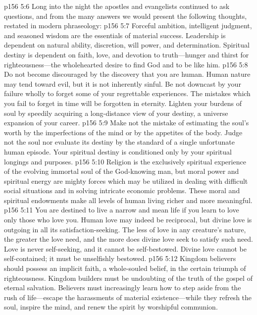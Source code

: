 \vs p156 5:6 Long into the night the apostles and evangelists continued to ask questions, and from the many answers we would present the following thoughts, restated in modern phraseology:
\vs p156 5:7 Forceful ambition, intelligent judgment, and seasoned wisdom are the essentials of material success. Leadership is dependent on natural ability, discretion, will power, and determination. Spiritual destiny is dependent on faith, love, and devotion to truth---hunger and thirst for righteousness---the wholehearted desire to find God and to be like him.
\vs p156 5:8 Do not become discouraged by the discovery that you are human. Human nature may tend toward evil, but it is not inherently sinful. Be not downcast by your failure wholly to forget some of your regrettable experiences. The mistakes which you fail to forget in time will be forgotten in eternity. Lighten your burdens of soul by speedily acquiring a long\hyp{}distance view of your destiny, a universe expansion of your career.
\vs p156 5:9 Make not the mistake of estimating the soul’s worth by the imperfections of the mind or by the appetites of the body. Judge not the soul nor evaluate its destiny by the standard of a single unfortunate human episode. Your spiritual destiny is conditioned only by your spiritual longings and purposes.
\vs p156 5:10 Religion is the exclusively spiritual experience of the evolving immortal soul of the God\hyp{}knowing man, but moral power and spiritual energy are mighty forces which may be utilized in dealing with difficult social situations and in solving intricate economic problems. These moral and spiritual endowments make all levels of human living richer and more meaningful.
\vs p156 5:11 You are destined to live a narrow and mean life if you learn to love only those who love you. Human love may indeed be reciprocal, but divine love is outgoing in all its satisfaction\hyp{}seeking. The less of love in any creature’s nature, the greater the love need, and the more does divine love seek to satisfy such need. Love is never self\hyp{}seeking, and it cannot be self\hyp{}bestowed. Divine love cannot be self\hyp{}contained; it must be unselfishly bestowed.
\vs p156 5:12 Kingdom believers should possess an implicit faith, a whole\hyp{}souled belief, in the certain triumph of righteousness. Kingdom builders must be undoubting of the truth of the gospel of eternal salvation. Believers must increasingly learn how to step aside from the rush of life---escape the harassments of material existence---while they refresh the soul, inspire the mind, and renew the spirit by worshipful communion.
